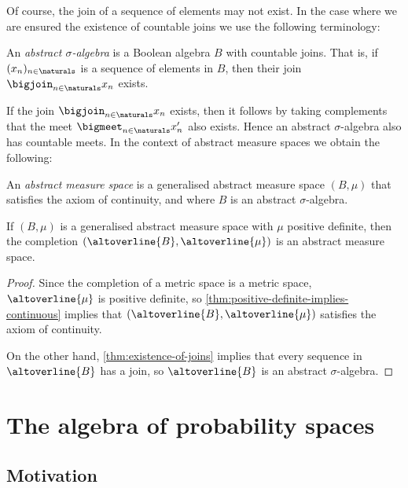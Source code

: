 \documentclass[article, a4paper, 11pt, oneside]{memoir}
\numberwithin{equation}{chapter}
\begin{document}
Of course, the join of a sequence of elements may not exist. In the case where we are ensured the existence of countable joins we use the following terminology:

\begin{definition}
    \label{def:abstract-sigma-algebra}
    An \emph{abstract $\sigma$-algebra} is a Boolean algebra $B$ with countable joins. That is, if $(x_n)_{n\in\naturals}$ is a sequence of elements in $B$, then their join $\bigjoin_{n\in\naturals} x_n$ exists.
\end{definition}
%
If the join $\bigjoin_{n\in\naturals} x_n$ exists, then it follows by taking complements that the meet $\bigmeet_{n\in\naturals} x_n'$ also exists. Hence an abstract $\sigma$-algebra also has countable meets. In the context of abstract measure spaces we obtain the following:

\begin{definition}
    \label{def:abstract-measure-space}
    An \emph{abstract measure space} is a generalised abstract measure space $(B,\mu)$ that satisfies the axiom of continuity, and where $B$ is an abstract $\sigma$-algebra.
\end{definition}

\begin{lemma}
    \label{thm:completion-gives-countable-additivity}
    If $(B,\mu)$ is a generalised abstract measure space with $\mu$ positive definite, then the completion $(\altoverline{B},\altoverline{\mu})$ is an abstract measure space.
\end{lemma}

\begin{proof}
    Since the completion of a metric space is a metric space, $\altoverline{\mu}$ is positive definite, so \cref{thm:positive-definite-implies-continuous} implies that $(\altoverline{B},\altoverline{\mu})$ satisfies the axiom of continuity.

    On the other hand, \cref{thm:existence-of-joins} implies that every sequence in $\altoverline{B}$ has a join, so $\altoverline{B}$ is an abstract $\sigma$-algebra.
\end{proof}



\chapter{The algebra of probability spaces}

\section{Motivation}
\end{document}
